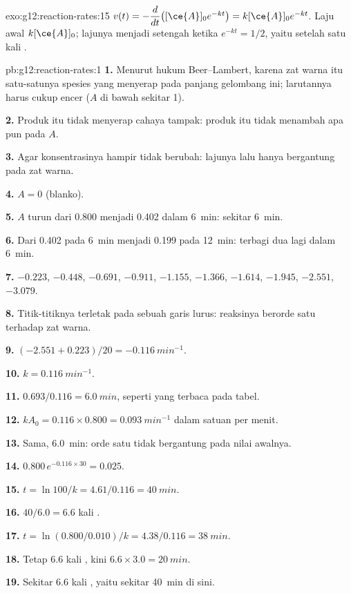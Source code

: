 \begin{solution}{exo:g12:reaction-rates:15}
$v(t) = -\dfrac{d}{dt}\big([\ce{A}]_0 e^{-kt}\big) = k[\ce{A}]_0 e^{-kt}$.
Laju awal $k[\ce{A}]_0$; lajunya menjadi setengah ketika
$e^{-kt} = 1/2$, yaitu setelah satu kali .
\end{solution}

\begin{solution}{pb:g12:reaction-rates:1}
\textbf{1.} Menurut hukum Beer--Lambert, karena zat warna itu
satu-satunya spesies yang menyerap pada panjang gelombang ini;
larutannya harus cukup encer ($A$ di bawah sekitar 1).

\textbf{2.} Produk itu tidak menyerap cahaya tampak: produk itu tidak
menambah apa pun pada $A$.

\textbf{3.} Agar konsentrasinya hampir tidak berubah: lajunya lalu
hanya bergantung pada zat warna.

\textbf{4.} $A = 0$ (blanko).

\textbf{5.} $A$ turun dari 0.800 menjadi 0.402 dalam \qty{6}{min}:
sekitar \qty{6}{min}.

\textbf{6.} Dari 0.402 pada \qty{6}{min} menjadi 0.199 pada
\qty{12}{min}: terbagi dua lagi dalam \qty{6}{min}.

\textbf{7.} $-0.223$, $-0.448$, $-0.691$, $-0.911$, $-1.155$, $-1.366$,
$-1.614$, $-1.945$, $-2.551$, $-3.079$.

\textbf{8.} Titik-titiknya terletak pada sebuah garis lurus: reaksinya
berorde satu terhadap zat warna.

\textbf{9.} $(-2.551 + 0.223)/20 = \qty{-0.116}{min^{-1}}$.

\textbf{10.} $k = \qty{0.116}{min^{-1}}$.

\textbf{11.} $0.693 / 0.116 = \qty{6.0}{min}$, seperti yang terbaca pada
tabel.

\textbf{12.} $k A_0 = 0.116 \times 0.800 = \qty{0.093}{min^{-1}}$ dalam
satuan  per menit.

\textbf{13.} Sama, \qty{6.0}{min}:  orde satu tidak
bergantung pada nilai awalnya.

\textbf{14.} $0.800\, e^{-0.116 \times 30} = 0.025$.

\textbf{15.} $t = \ln 100 / k = 4.61 / 0.116 = \qty{40}{min}$.

\textbf{16.} $40 / 6.0 = 6.6$ kali .

\textbf{17.} $t = \ln(0.800/0.010)/k = 4.38 / 0.116 = \qty{38}{min}$.

\textbf{18.} Tetap 6.6 kali , kini $6.6 \times 3.0 = \qty{20}{min}$.

\textbf{19.} Sekitar 6.6 kali , yaitu sekitar \qty{40}{min}
di sini.
\end{solution}

